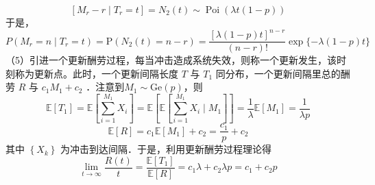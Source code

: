 \documentclass[UTF8]{ctexart}
\begin{document}
$$
\left[M_{r}-r \mid T_{r}=t\right]=N_{2}(t) \sim \operatorname{Poi}(\lambda t(1-p))
$$
于是，
$$
P\left(M_{r}=n \mid T_{r}=t\right)=\mathrm{P}\left(N_{2}(t)=n-r \right)=\frac{[\lambda(1-p) t]^{n-r}}{(n-r)!} \exp \{-\lambda(1-p) t\}
$$
（5）引进一个更新酬劳过程，每当冲击造成系统失效，则称一个更新发生，该时刻称为更新点。此时，一个更新间隔长度 $T$ 与 $T_{1}$ 同分布，一个更新间隔里总的酬劳 $R$ 与 $c_{1} M_{1}+c_{2}$ ．注意到$M_1 \sim \mathrm{Ge}(p)$，则
$$
\mathbb{E}\left[T_{1}\right]=\mathbb{E}\left[\sum_{i=1}^{M_{1}} X_{i}\right]=\mathbb{E}\left[ \mathbb{E}\left[\sum_{i=1}^{M_{1}} X_{i}\mid M_1\right]\right] =\frac{1}{\lambda}\mathbb{E}[M_1]=\frac{1}{\lambda p} 
$$
$$
\mathbb{E}[R]=c_{1} \mathbb{E}\left[M_{1}\right]+c_{2}=\frac{c_{1}}{p}+c_{2}
$$
其中 $\left\{X_{k}\right\}$ 为冲击到达间隔．于是，利用更新酬劳过程理论得
$$
\lim _{t \rightarrow \infty} \frac{R(t)}{t}=\frac{\mathbb{E}\left[T_{1}\right]}{\mathbb{E}[R]}=c_{1} \lambda+c_{2} \lambda p=c_{1}+c_{2} p
$$\\
\end{document}
